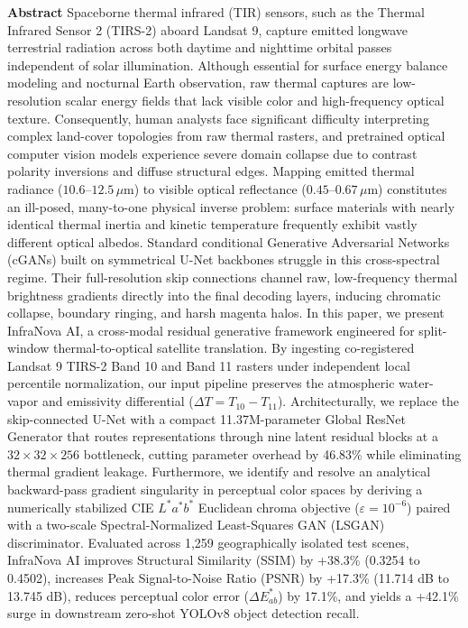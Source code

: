 \documentclass[10pt,a4paper,twoside]{article}
\begin{document}
\noindent\textbf{Abstract}\hspace{4pt}
Spaceborne thermal infrared (TIR) sensors, such as the Thermal Infrared Sensor 2 (TIRS-2) aboard Landsat 9, capture emitted longwave terrestrial radiation across both daytime and nighttime orbital passes independent of solar illumination. Although essential for surface energy balance modeling and nocturnal Earth observation, raw thermal captures are low-resolution scalar energy fields that lack visible color and high-frequency optical texture. Consequently, human analysts face significant difficulty interpreting complex land-cover topologies from raw thermal rasters, and pretrained optical computer vision models experience severe domain collapse due to contrast polarity inversions and diffuse structural edges. Mapping emitted thermal radiance ($10.6\text{--}12.5\,\mu\text{m}$) to visible optical reflectance ($0.45\text{--}0.67\,\mu\text{m}$) constitutes an ill-posed, many-to-one physical inverse problem: surface materials with nearly identical thermal inertia and kinetic temperature frequently exhibit vastly different optical albedos. Standard conditional Generative Adversarial Networks (cGANs) built on symmetrical U-Net backbones struggle in this cross-spectral regime. Their full-resolution skip connections channel raw, low-frequency thermal brightness gradients directly into the final decoding layers, inducing chromatic collapse, boundary ringing, and harsh magenta halos. In this paper, we present InfraNova AI, a cross-modal residual generative framework engineered for split-window thermal-to-optical satellite translation. By ingesting co-registered Landsat 9 TIRS-2 Band 10 and Band 11 rasters under independent local percentile normalization, our input pipeline preserves the atmospheric water-vapor and emissivity differential ($\Delta T = T_{10} - T_{11}$). Architecturally, we replace the skip-connected U-Net with a compact 11.37M-parameter Global ResNet Generator that routes representations through nine latent residual blocks at a $32 \times 32 \times 256$ bottleneck, cutting parameter overhead by 46.83\% while eliminating thermal gradient leakage. Furthermore, we identify and resolve an analytical backward-pass gradient singularity in perceptual color spaces by deriving a numerically stabilized CIE $L^*a^*b^*$ Euclidean chroma objective ($\varepsilon = 10^{-6}$) paired with a two-scale Spectral-Normalized Least-Squares GAN (LSGAN) discriminator. Evaluated across 1,259 geographically isolated test scenes, InfraNova AI improves Structural Similarity (SSIM) by +38.3\% (0.3254 to 0.4502), increases Peak Signal-to-Noise Ratio (PSNR) by +17.3\% (11.714 dB to 13.745 dB), reduces perceptual color error ($\Delta E^*_{ab}$) by 17.1\%, and yields a +42.1\% surge in downstream zero-shot YOLOv8 object detection recall.
\end{document}
